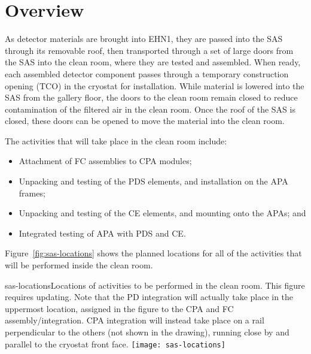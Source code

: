 

\section{Overview}

As detector materials are brought into EHN1, they are passed into the SAS through its removable roof, then transported through a set of large doors from the SAS into the clean room, where they are tested and assembled. When ready, each assembled detector component passes through a temporary construction opening (TCO) in the cryostat for installation.
While material is lowered into the SAS from the gallery floor, the doors to the clean room remain closed to reduce contamination of the filtered air in the clean room.
Once the roof of the SAS is closed, these doors can be opened to move the material into the clean room. 

The activities that will take place in the clean room include:
\begin{itemize}
\item Attachment of FC assemblies to CPA modules;
\item Unpacking and testing of the PDS elements, and installation on the APA frames;
\item Unpacking and testing of the CE elements, and mounting onto the APAs; and  
\item Integrated testing of APA with PDS and CE.  
\end{itemize}
 Figure~\ref{fig:sas-locations} shows the planned locations for all of the activities that will be performed inside the clean room.  

\begin{cdrfigure}{sas-locations}{Locations of activities to be performed in the clean room. This figure requires updating. Note that the PD integration will actually take place in the uppermost location, assigned in the figure to the CPA and FC assembly/integration. CPA integration will instead take place on a rail perpendicular to the others (not shown in the drawing), running close by and parallel to the cryostat front face.}
\texttt{[image: sas-locations]}
\end{cdrfigure}

